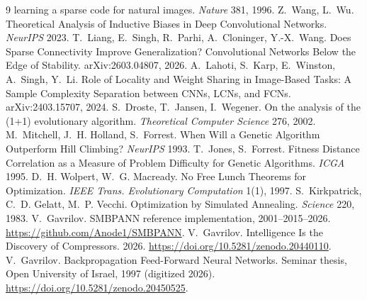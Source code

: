 \documentclass[11pt]{article}
\begin{document}
\begin{thebibliography}{9}
 learning a sparse code for natural images. \emph{Nature} 381, 1996.
 Z.~Wang, L.~Wu. Theoretical Analysis of Inductive Biases in Deep Convolutional Networks.
 \emph{NeurIPS} 2023.
 T.~Liang, E.~Singh, R.~Parhi, A.~Cloninger, Y.-X.~Wang. Does Sparse Connectivity Improve
Generalization? Convolutional Networks Below the Edge of Stability. arXiv:2603.04807, 2026.
 A.~Lahoti, S.~Karp, E.~Winston, A.~Singh, Y.~Li. Role of Locality and Weight Sharing in
 Image-Based Tasks: A Sample Complexity Separation between CNNs, LCNs, and FCNs. arXiv:2403.15707, 2024.
 S.~Droste, T.~Jansen, I.~Wegener. On the analysis of the (1+1) evolutionary algorithm.
 \emph{Theoretical Computer Science} 276, 2002.
 M.~Mitchell, J.~H. Holland, S.~Forrest. When Will a Genetic Algorithm Outperform Hill
 Climbing? \emph{NeurIPS} 1993.
 T.~Jones, S.~Forrest. Fitness Distance Correlation as a Measure of Problem Difficulty for
 Genetic Algorithms. \emph{ICGA} 1995.
 D.~H. Wolpert, W.~G. Macready. No Free Lunch Theorems for Optimization. \emph{IEEE Trans.
 Evolutionary Computation} 1(1), 1997.
 S.~Kirkpatrick, C.~D. Gelatt, M.~P. Vecchi. Optimization by Simulated Annealing.
 \emph{Science} 220, 1983.
 V.~Gavrilov. SMBPANN reference implementation, 2001--2015--2026.
 \url{https://github.com/Anode1/SMBPANN}.
 V.~Gavrilov. Intelligence Is the Discovery of Compressors. 2026.
 \url{https://doi.org/10.5281/zenodo.20440110}.
 V.~Gavrilov. Backpropagation Feed-Forward Neural Networks. Seminar thesis, Open
 University of Israel, 1997 (digitized 2026). \url{https://doi.org/10.5281/zenodo.20450525}.
\end{thebibliography}
\end{document}

